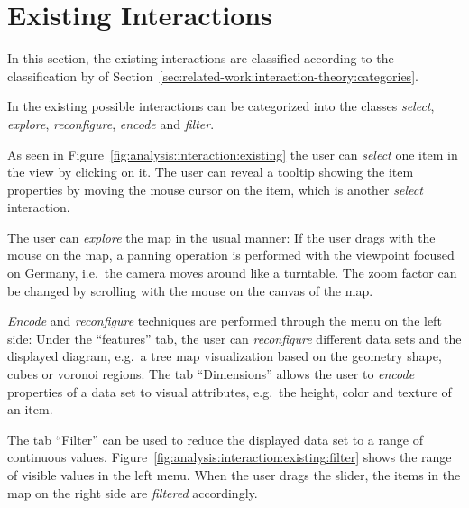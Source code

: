 \section{Existing Interactions}
In this section, the existing interactions are classified according to the classification by \textcite{Yi2007} of Section~\ref{sec:related-work:interaction-theory:categories}.

In the existing \visan{} possible interactions can be categorized into the classes \emph{select}, \emph{explore}, \emph{reconfigure}, \emph{encode} and \emph{filter}.

As seen in Figure~\ref{fig:analysis:interaction:existing} the user can \emph{select} one item in the view by clicking on it.
The user can reveal a tooltip showing the item properties by moving the mouse cursor on the item, which is another \emph{select} interaction.

The user can \emph{explore} the map in the usual manner:
If the user drags with the mouse on the map, a panning operation is performed with the viewpoint focused on Germany, i.e.\ the camera moves around like a turntable.
The zoom factor can be changed by scrolling with the mouse on the canvas of the map.

\emph{Encode} and \emph{reconfigure} techniques are performed through the menu on the left side:
Under the ``features'' tab, the user can \emph{reconfigure} different data sets and the displayed diagram, e.g.\ a tree map visualization based on the geometry shape, cubes or voronoi regions.
The tab ``Dimensions'' allows the user to \emph{encode} properties of a data set to visual attributes, e.g.\ the height, color and texture of an item.

The tab ``Filter'' can be used to reduce the displayed data set to a range of continuous values.
Figure~\ref{fig:analysis:interaction:existing:filter} shows the range of visible values in the left menu.
When the user drags the slider, the items in the map on the right side are \emph{filtered} accordingly.

